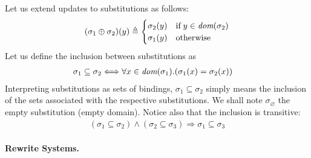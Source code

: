 Let us extend updates to substitutions as follows:
\begin{equation}
(\sigma_1 \oplus \sigma_2)(y) \triangleq
\begin{cases}
  \sigma_2(y) & \text{if} \; y \in \text{\it dom}(\sigma_2)\\
  \sigma_1(y) & \text{otherwise}
\end{cases}
\label{model:oplus:ext}
\end{equation}
Let us define the inclusion between substitutions as
\begin{align}
  \sigma_1 \subseteq \sigma_2
&\Longleftrightarrow 
  \forall x \in \text{\it dom}(\sigma_1).(\sigma_1(x) =
  \sigma_2(x)) \label{model:incl}
\end{align}
Interpreting substitutions as sets of bindings, \(\sigma_1 \subseteq
\sigma_2\) simply means the inclusion of the sets associated with the
respective substitutions. We shall note \(\sigma_\varnothing\) the
empty substitution (empty domain). Notice also that the inclusion is
transitive:
\begin{gather}
(\sigma_1 \subseteq \sigma_2) \wedge (\sigma_2 \subseteq \sigma_3)
\Rightarrow \sigma_1 \subseteq \sigma_3%
\end{gather}

\paragraph{Rewrite Systems.}

